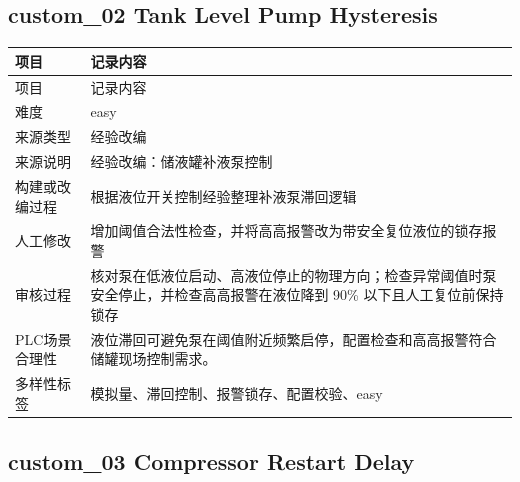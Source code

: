 \subsection{{\ttfamily custom\_02} Tank Level Pump Hysteresis}

\begin{longtable}{L{3.0cm}L{10.3cm}}

\toprule

项目 & 记录内容\\

\midrule

\endfirsthead

\toprule

项目 & 记录内容\\

\midrule

\endhead

难度 & easy\\

来源类型 & 经验改编\\

来源说明 & 经验改编：储液罐补液泵控制\\

构建或改编过程 & 根据液位开关控制经验整理补液泵滞回逻辑\\

人工修改 & 增加阈值合法性检查，并将高高报警改为带安全复位液位的锁存报警\\

审核过程 & 核对泵在低液位启动、高液位停止的物理方向；检查异常阈值时泵安全停止，并检查高高报警在液位降到 90\% 以下且人工复位前保持锁存\\

PLC场景合理性 & 液位滞回可避免泵在阈值附近频繁启停，配置检查和高高报警符合储罐现场控制需求。\\

多样性标签 & 模拟量、滞回控制、报警锁存、配置校验、easy\\

\bottomrule

\end{longtable}

\subsection{{\ttfamily custom\_03} Compressor Restart Delay}

